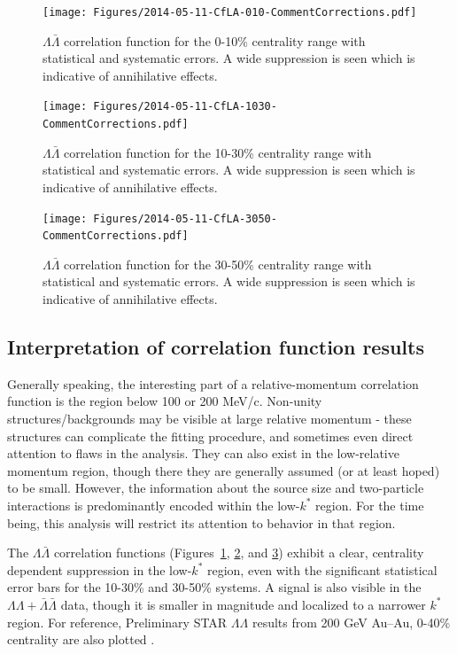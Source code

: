 \begin{figure}[hbtp]
\texttt{[image: Figures/2014-05-11-CfLA-010-CommentCorrections.pdf]}
\caption[$\Lambda\bar{\Lambda}$ correlation function for the 0-10\% centrality range]{$\Lambda\bar{\Lambda}$ correlation function for the 0-10\% centrality range with statistical and systematic errors.  A wide suppression is seen which is indicative of annihilative effects.}
\label{fig:CFLamALam010}
\end{figure}
\begin{figure}[hbtp]
\texttt{[image: Figures/2014-05-11-CfLA-1030-CommentCorrections.pdf]}
\caption[$\Lambda\bar{\Lambda}$ correlation function for the 10-30\% centrality range]{$\Lambda\bar{\Lambda}$ correlation function for the 10-30\% centrality range with statistical and systematic errors.  A wide suppression is seen which is indicative of annihilative effects.}
\label{fig:CFLamALam1030}
\end{figure}
\begin{figure}[hbtp]
\texttt{[image: Figures/2014-05-11-CfLA-3050-CommentCorrections.pdf]}
\caption[$\Lambda\bar{\Lambda}$ correlation function for the 30-50\% centrality range]{$\Lambda\bar{\Lambda}$ correlation function for the 30-50\% centrality range with statistical and systematic errors.  A wide suppression is seen which is indicative of annihilative effects.}
\label{fig:CFLamALam3050}
\end{figure}

\subsection{Interpretation of correlation function results}
\label{sec:CFInterpretation}


Generally speaking, the interesting part of a relative-momentum correlation function is the region below 100 or 200 MeV/c.  Non-unity structures/backgrounds may be visible at large relative momentum - these structures can complicate the fitting procedure, and sometimes even direct attention to flaws in the analysis.  They can also exist in the low-relative momentum region, though there they are generally assumed (or at least hoped) to be small.  However, the information about the source size and two-particle interactions is predominantly encoded within the low-$k^*$ region.  For the time being, this analysis will restrict its attention to behavior in that region.

The $\Lambda\bar{\Lambda}$ correlation functions (Figures\ \ref{fig:CFLamALam010}, \ref{fig:CFLamALam1030}, and \ref{fig:CFLamALam3050}) exhibit a clear, centrality dependent suppression in the low-$k^*$ region, even with the significant statistical error bars for the 10-30\% and 30-50\% systems.  A signal is also visible in the $\Lambda\Lambda + \bar{\Lambda}\bar{\Lambda}$ data, though it is smaller in magnitude and localized to a narrower $k^*$ region. For reference, Preliminary STAR $\Lambda\Lambda$ results from 200 GeV Au--Au, 0-40\% centrality are also plotted \cite{Shah:2012ps}.

